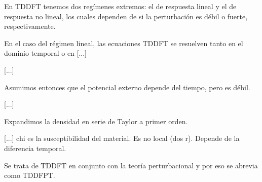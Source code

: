   En TDDFT tenemos dos regímenes extremos: el de respuesta lineal y el de respuesta no lineal, los cuales dependen de si la perturbación es débil o fuerte, respectivamente.

  En el caso del régimen lineal, las ecuaciones TDDFT se resuelven tanto en el dominio temporal o en [...]

  [...]

  Asumimos entonces que el potencial externo depende del tiempo, pero es débil.

  [...]

  Expandimos la densidad en serie de Taylor a primer orden.

  [...]  chi es la susceptibilidad del material. Es no local (dos r). Depende de la diferencia temporal.

  Se trata de TDDFT en conjunto con la teoría perturbacional y por eso se abrevia como TDDFPT.

